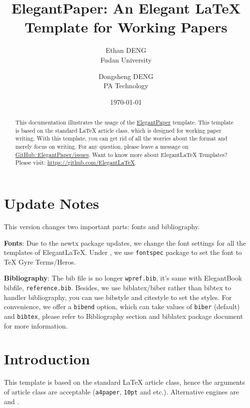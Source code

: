 \documentclass[11pt,en]{elegantpaper}
\title{ElegantPaper: An Elegant \LaTeX{} Template for Working Papers}
\author{Ethan DENG \\ Fudan University \and Dongsheng DENG \\ PA Technology}
\institute{\href{https://github.com/ElegantLaTeX}{Elegant\LaTeX{} Program}}
\date{\today}
\begin{document}
\maketitle

\begin{abstract}
This documentation illustrates the usage of the \href{https://github.com/ElegantLaTeX/ElegantPaper}{ElegantPaper} template. This template is based on the standard \LaTeX{} article class, which is designed for working paper writing. With this template, you can get rid of all the worries about the format and merely focus on writing. For any question, please leave a message on \href{https://github.com/ElegantLaTeX/ElegantPaper/issues}{GitHub::ElegantPaper/issues}. Want to know more about Elegant\LaTeX{} Templates? Please visit: \href{https://github.com/ElegantLaTeX}{https://github.com/ElegantLaTeX}.\par
{}
\end{abstract}


\section*{Update Notes}

This version changes two important parts: fonts and bibliography.

\textbf{Fonts}: Due to the newtx package updates, we change the font settings for all the templates of ElegantLaTeX. Under , we use \lstinline{fontspec} package  to set the font to TeX Gyre Terms/Heros. 

\textbf{Bibliography}: The bib file is no longer \lstinline{wpref.bib}, it's same with ElegantBook bibfile, \lstinline{reference.bib}. Besides, we use biblatex/biber rather than bibtex to handler bibliography, you can use bibstyle and citestyle to set the styles. For convenience, we offer a \lstinline{bibend} option, which can take values of \lstinline{biber} (default) and \lstinline{bibtex}, please refer to Bibliography section and biblatex package document for more information.

\section{Introduction}

This template is based on the standard \LaTeX{} article class, hence the arguments of article class are acceptable (\lstinline{a4paper}, \lstinline{10pt} and etc.). Alternative engines are  and .
\end{document}
